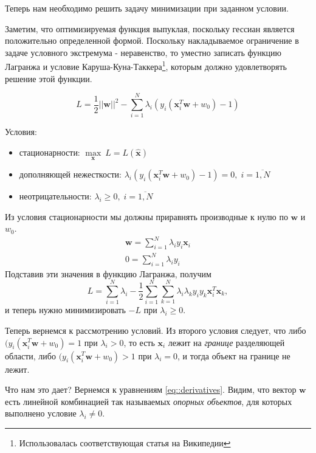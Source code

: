 \documentclass[12pt]{article}
\renewcommand{\geq}{\ensuremath{\geqslant}}
\begin{document}
	Теперь нам необходимо решить задачу минимизации при заданном условии.
	
	Заметим, что оптимизируемая функция выпуклая, поскольку гессиан является положительно определенной формой.
	Поскольку накладываемое ограничение в задаче условного экстремума - неравенство, то уместно записать функцию Лагранжа и условие Каруша-Куна-Таккера\footnote{Использовалась соответствующая статья на Википедии}, которым должно удовлетворять решение этой функции.
	
	$$L = \dfrac{1}{2}||\mathbf{w}||^2 - \sum_{i=1}^{N}\lambda_i(y_i(\mathbf{x}_i^T\mathbf{w} + w_0) - 1)$$
	
	Условия:
	\begin{itemize}
		\item стационарности: $\underset{\mathbf{x}}{\max}\ L = L(\hat{\mathbf{x}})$
		\item дополняющей нежесткости: $\lambda_i(y_i(\mathbf{x}_i^T\mathbf{w} + w_0) - 1) = 0, \; i = \overline{1,N}$
		\item неотрицательности: $\lambda_i \geq 0,  \; i = \overline{1,N}$
	\end{itemize}

	Из условия стационарности мы должны приравнять производные к нулю по $\mathbf{w}$ и $w_0$. 
	\begin{align}
	\label{eq::derivatives}
\mathbf{w} = \sum_{i=1}^{N}\lambda_i y_i \mathbf{x}_i
\\
	 0 = \sum_{i=1}^{N}\lambda_i y_i
	\end{align}	
	Подставив эти значения в функцию Лагранжа, получим
	$$L = \sum_{i=1}^{N}\lambda_i - \dfrac{1}{2}\sum_{i=1}^N\sum_{k=1}^N\lambda_i\lambda_ky_iy_k\mathbf{x}_i^T\mathbf{x}
_k,$$ и теперь нужно минимизировать $-L$ при $\lambda_i \geq 0$.

Теперь вернемся к рассмотрению условий. Из второго условия следует, что либо $(y_i(\mathbf{x}_i^T\mathbf{w} + w_0) = 1$ при $\lambda_i > 0$, то есть $\mathbf{x}_i$ лежит на \textit{границе} разделяющей области, либо $(y_i(\mathbf{x}_i^T\mathbf{w} + w_0) > 1$ при $\lambda_i = 0$, и тогда объект на границе не лежит. 

Что нам это дает? Вернемся к уравнениям \eqref{eq::derivatives}. Видим, что вектор $\mathbf{w}$ есть линейной комбинацией  так называемых \textit{опорных объектов}, для которых выполнено условие $\lambda_i \neq 0$.
\end{document}
